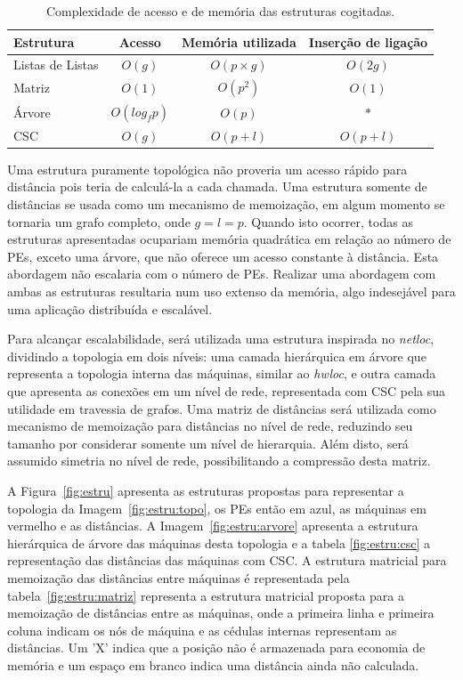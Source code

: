 \documentclass[
	12pt,				%
	openright,			%
	twoside,			%
	a4paper,			%
	english,			%
	brazil,				%
	]{abntex2}
\newcommand{\hwloc}{{\textit{hwloc}}\xspace}
\newcommand{\netloc}{{\textit{netloc}}\xspace}
\begin{document}
\setlength{\tabcolsep}{0.5em}
\begin{table}[!ht]
    \centering
    \begin{tabular}{l c c c}
        \toprule
        \textbf{Estrutura} & \textbf{Acesso} &  \textbf{Memória utilizada} & \textbf{Inserção de ligação} \\ \midrule
        Listas de Listas & $O(g)$ & $O(p \times g)$ & $O(2g)$ \\
        Matriz & $O(1)$ & $O(p^2)$ & $O(1)$ \\
        Árvore & $O(log_f p)$ & $O(p)$ & $*$ \\
        CSC &  $O(g)$ & $O(p+l)$ & $O(p + l)$  \\ \bottomrule
    \end{tabular}
    \caption[Complexidade de acesso e de memória das estruturas cogitadas.]{Complexidade de acesso e de memória das estruturas cogitadas.}
    \label{tab:struct_comparison}
\end{table}


Uma estrutura puramente topológica não proveria um acesso rápido para distância pois teria de calculá-la a cada chamada.
Uma estrutura somente de distâncias se usada como um mecanismo de memoização, em algum momento se tornaria um grafo completo, onde $g = l = p$. 
Quando isto ocorrer, todas as estruturas apresentadas ocupariam memória quadrática em relação ao número de PEs, exceto uma árvore, que não oferece um acesso constante à distância. 
Esta abordagem não escalaria com o número de PEs. Realizar uma abordagem com ambas as estruturas resultaria num uso extenso da memória, algo indesejável para uma aplicação distribuída e escalável.

Para alcançar escalabilidade, será utilizada uma estrutura inspirada no \netloc, dividindo a topologia em dois níveis: uma camada hierárquica em árvore que representa a topologia interna das máquinas, similar ao \hwloc, e outra camada que apresenta as conexões em um nível de rede, representada com CSC pela sua utilidade em travessia de grafos. 
Uma matriz de distâncias será utilizada como mecanismo de memoização para distâncias no nível de rede, reduzindo seu tamanho por considerar somente um nível de hierarquia. Além disto, será assumido simetria no nível de rede, possibilitando a compressão desta matriz.

A Figura~\ref{fig:estru} apresenta as estruturas propostas para representar a topologia da Imagem~\ref{fig:estru:topo}, os PEs então em azul, as máquinas em vermelho e as distâncias. 
A Imagem~\ref{fig:estru:arvore} apresenta a estrutura hierárquica de árvore das máquinas desta topologia e a tabela \ref{fig:estru:csc} a representação das distâncias das máquinas com CSC. 
A estrutura matricial para memoização das distâncias entre máquinas é representada pela tabela~\ref{fig:estru:matriz} representa a estrutura matricial proposta para a memoização de distâncias entre as máquinas, onde a primeira linha e primeira coluna indicam os nós de máquina e as cédulas internas representam as distâncias.
Um 'X' indica que a posição não é armazenada para economia de memória e um espaço em branco indica uma distância ainda não calculada.
\end{document}
